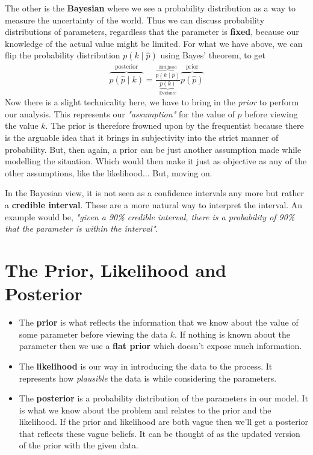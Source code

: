 \documentclass[11pt]{article}   %
\begin{document}
The other is the \textbf{Bayesian} where we see a probability distribution as a way to measure the uncertainty of the world. Thus we can discuss probability distributions of parameters, regardless that the parameter is \textbf{fixed}, because our knowledge of the actual value might be limited. For what we have above, we can flip the probability distribution $p(k\mid \hat{p})$ using Bayes' theorem, to get
\begin{align}\label{Bayes' Theorem}
\overbrace{p(\hat{p}\mid k)}^\text{posterior} = \frac{\overbrace{p(k\mid \hat{p})}^\text{likelihood}}{\underbrace{p(k)}_\text{Evidance}} \overbrace{p(\hat{p})}^\text{prior}
\end{align}
Now there is a slight technicality here, we have to bring in the \textit{prior} to perform our analysis. This represents our \textit{"assumption"} for the value of $p$ before viewing the value $k$. The prior is therefore frowned upon by the frequentist because there is the arguable idea that it brings in subjectivity into the strict manner of probability. But, then again, a prior can be just another assumption made while modelling the situation. Which would then make it just as objective as any of the other assumptions, like the likelihood... But, moving on.

In the Bayesian view, it is not seen as a confidence intervals any more but rather a \textbf{credible interval}. These are a more natural way to interpret the interval. An example would be, \textit{"given a 90\% credible interval, there is a probability of 90\% that the parameter is within the interval"}.

\section{The Prior, Likelihood and Posterior}\label{The Prior, Likelihood and Posterior}

\begin{itemize}
\item The \textbf{prior} is what reflects the information that we know about the value of some parameter before viewing the data $k$. If nothing is known about the parameter then we use a \textbf{flat prior} which doesn't expose much information.
\item The \textbf{likelihood} is our way in introducing the data to the process. It represents how \textit{plausible} the data is while considering the parameters.
\item The \textbf{posterior} is a probability distribution of the parameters in our model. It is what we know about the problem and relates to the prior and the likelihood. If the prior and likelihood are both vague then we'll get a posterior that reflects these vague beliefs. It can be thought of as the updated version of the prior with the given data.
\end{itemize}
\end{document}
